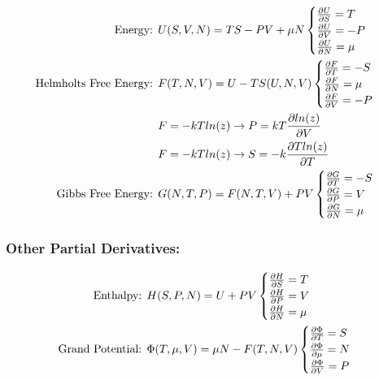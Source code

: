 \begin{align}
	\text{Energy: }                & U(S, V, N) = TS - PV + \mu N
	\begin{cases}
		\pdv{U}{S} = T   \\
		\pdv{U}{V} = -P  \\
		\pdv{U}{N} = \mu \\
	\end{cases}                                                                     \\
	\text{Helmholts Free Energy: } & F(T, N, V) = U - T S(U, N, V)
	\begin{cases}
		\pdv{F}{T} = -S  \\
		\pdv{F}{N} = \mu \\
		\pdv{F}{V} = -P  \\
	\end{cases}                                                                     \\
	                               & F = -k T ln(z) \rightarrow P = k T \pdv{ln(z)}{V}   \\
	                               & F = -k T ln(z) \rightarrow S = - k \pdv{T ln(z)}{T} \\
	\text{Gibbs Free Energy: }     & G(N, T, P) = F(N, T, V) + PV
	\begin{cases}
		\pdv{G}{T} = -S  \\
		\pdv{G}{P} = V   \\
		\pdv{G}{N} = \mu \\
	\end{cases}                                                                     \\
\end{align}

\subsubsection*{Other Partial Derivatives:}

\begin{align}
	\text{Enthalpy: }        & H(S, P, N) = U + PV
	\begin{cases}
		\pdv{H}{S} = T   \\
		\pdv{H}{P} = V   \\
		\pdv{H}{N} = \mu \\
	\end{cases}                                                \\
	\text{Grand Potential: } & \Phi(T, \mu, V) = \mu N - F(T, N, V)
	\begin{cases}
		\pdv{\Phi}{T} = S   \\
		\pdv{\Phi}{\mu} = N \\
		\pdv{\Phi}{V} = P   \\
	\end{cases}
\end{align}

